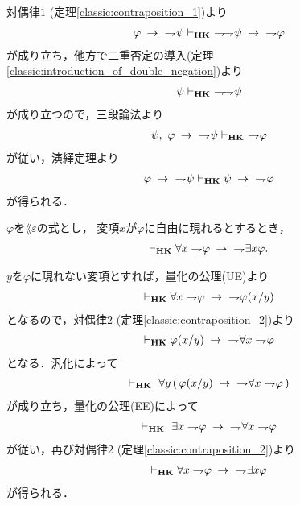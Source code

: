 	\begin{sketch}
		対偶律$1$ (定理\ref{classic:contraposition_1})より
		\begin{align}
			\varphi \rarrow\ \negation \psi \provable{\mbox{{\bf HK}}}\ 
			\negation \negation \psi \rarrow\ \negation \varphi
		\end{align}
		が成り立ち，他方で二重否定の導入(定理\ref{classic:introduction_of_double_negation})より
		\begin{align}
			\psi \vdash_{{\scriptsize \mbox{{\bf HK}}}}\ \rightharpoondown\hspace{-0.25em} \rightharpoondown\hspace{-0.25em} \psi
		\end{align}
		が成り立つので，三段論法より
		\begin{align}
			\psi,\ \varphi \rarrow\ \negation \psi \provable{\mbox{{\bf HK}}}\ 
			\negation \varphi
		\end{align}
		が従い，演繹定理より
		\begin{align}
			\varphi \hspace{0.25em}\rightarrow\hspace{0.25em}\ \rightharpoondown\hspace{-0.25em} \psi \vdash_{{\scriptsize \mbox{{\bf HK}}}}
			\psi \hspace{0.25em}\rightarrow\hspace{0.25em}\ \rightharpoondown\hspace{-0.25em} \varphi
		\end{align}
		が得られる．
		\QED
	\end{sketch}
	
	\begin{screen}
		\begin{thm}
		\label{classic:weak_De_Morgan_law_for_quantifier_2}
			$\varphi$を$\lang{\varepsilon}$の式とし，
			変項$x$が$\varphi$に自由に現れるとするとき，
			\begin{align}
				\vdash_{{\scriptsize \mbox{{\bf HK}}}} \forall x \rightharpoondown\hspace{-0.25em} \varphi
				\hspace{0.25em}\rightarrow\hspace{0.25em}\ \rightharpoondown\hspace{-0.25em} \exists x \varphi.
			\end{align}
		\end{thm}
	\end{screen}
	
	\begin{sketch}
		$y$を$\varphi$に現れない変項とすれば，量化の公理(UE)より
		\begin{align}
			\vdash_{{\scriptsize \mbox{{\bf HK}}}} \forall x \rightharpoondown\hspace{-0.25em} \varphi \hspace{0.25em}\rightarrow\hspace{0.25em}\ \rightharpoondown\hspace{-0.25em} \varphi(x/y)
		\end{align}
		となるので，対偶律$2$ (定理\ref{classic:contraposition_2})より
		\begin{align}
			\vdash_{{\scriptsize \mbox{{\bf HK}}}} \varphi(x/y) \hspace{0.25em}\rightarrow\hspace{0.25em}\ \rightharpoondown\hspace{-0.25em} \forall x \rightharpoondown\hspace{-0.25em} \varphi
		\end{align}
		となる．汎化によって
		\begin{align}
			\vdash_{{\scriptsize \mbox{{\bf HK}}}}\ \forall y\, (\, \varphi(x/y) \hspace{0.25em}\rightarrow\hspace{0.25em}\ \rightharpoondown\hspace{-0.25em} \forall x \rightharpoondown\hspace{-0.25em} \varphi\, )
		\end{align}
		が成り立ち，量化の公理(EE)によって
		\begin{align}
			\vdash_{{\scriptsize \mbox{{\bf HK}}}}\ \exists x \rightharpoondown\hspace{-0.25em} \varphi \hspace{0.25em}\rightarrow\hspace{0.25em}\ \rightharpoondown\hspace{-0.25em} \forall x \rightharpoondown\hspace{-0.25em} \varphi
		\end{align}
		が従い，再び対偶律$2$ (定理\ref{classic:contraposition_2})より
		\begin{align}
			\vdash_{{\scriptsize \mbox{{\bf HK}}}} \forall x \rightharpoondown\hspace{-0.25em} \varphi \hspace{0.25em}\rightarrow\hspace{0.25em}\ \rightharpoondown\hspace{-0.25em} \exists x \varphi
		\end{align}
		が得られる．
		\QED
	\end{sketch}
	

